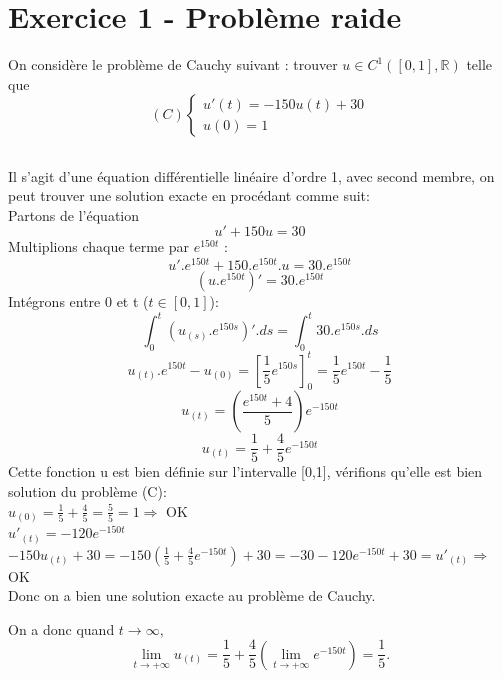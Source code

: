 \documentclass[a4paper,12pt,landscape]{article}
\begin{document}
\section{Exercice 1 - Problème raide}
On considère le problème de Cauchy suivant :
trouver $u \in C^{1}([0,1], \mathbb{R} )$ telle que
$$
(C) \left \{
\begin{array}{l}
	u'(t)= -150u(t) + 30 \\
	u(0) = 1
\end{array}
\right.
$$
\newpage
\subsection{}
Il s'agit d'une équation différentielle linéaire d'ordre 1, avec second membre, on peut trouver une solution exacte en procédant comme suit:\\
Partons de l'équation $$u' + 150u = 30$$
Multiplions chaque terme par $e^{150t}$ : $$u'.e^{150t}+150.e^{150t}.u = 30.e^{150t}$$
$$(u.e^{150t})'=30.e^{150t}$$
Intégrons entre 0 et t ($t \in [0,1]$): $$\int_{0}^{t}(u_{(s)}.e^{150s})'.ds = \int_{0}^{t}30.e^{150s}.ds$$
$$u_{(t)}.e^{150t}-u_{(0)} = {\left [ \frac{1}{5}e^{150s} \right ]}_{0}^{t}= \frac{1}{5}e^{150t}-\frac{1}{5}$$
$$u_{(t)} = { \left ( \frac{e^{150t}+4}{5} \right ) }e^{-150t}$$
$$u_{(t)} = \frac{1}{5}+\frac{4}{5}e^{-150t}$$
Cette fonction u est bien définie sur l'intervalle [0,1], vérifions qu'elle est bien solution du problème (C):\\

$u_{(0)}= \frac{1}{5}+\frac{4}{5}=\frac{5}{5}=1 \Rightarrow $ OK\\

$u'_{(t)}= -120e^{-150t}$\\

$-150 u_{(t)} +30 = -150{ \left( \frac{1}{5}+\frac{4}{5}e^{-150t} \right) } +30 = -30 -120e^{-150t} +30 = u'_{(t)} \Rightarrow $OK\\

Donc on a bien une solution exacte au problème de Cauchy.

On a donc quand $t \rightarrow \infty$, 
$$\lim_{t \rightarrow +\infty}u_{(t)}=\frac{1}{5}+\frac{4}{5} { \left( \lim_{t \rightarrow +\infty}e^{-150t} \right ) }= \frac{1}{5}.$$
\end{document}
